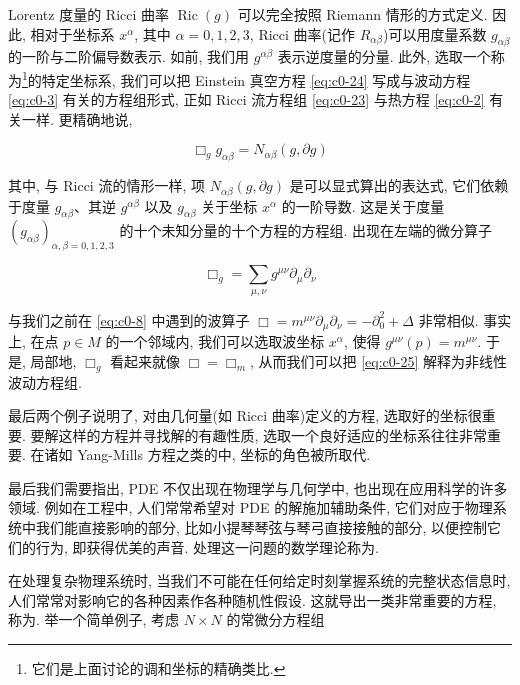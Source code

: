 Lorentz 度量的 Ricci 曲率 $\operatorname{Ric}(g)$ 可以完全按照 Riemann 情形的方式定义.
因此, 相对于坐标系 $x^{\alpha}$, 其中 $\alpha = 0, 1, 2, 3$, Ricci 曲率(记作 $R_{\alpha \beta}$)可以用度量系数 $g_{\alpha \beta}$ 的一阶与二阶偏导数表示.
如前, 我们用 $g^{\alpha \beta}$ 表示逆度量的分量.
此外, 选取一个称为\footnote{它们是上面讨论的调和坐标的精确类比.}的特定坐标系, 我们可以把 Einstein 真空方程 \eqref{eq:c0-24} 写成与波动方程 \eqref{eq:c0-3} 有关的方程组形式, 正如 Ricci 流方程组 \eqref{eq:c0-23} 与热方程 \eqref{eq:c0-2} 有关一样.
更精确地说,

\begin{equation}\label{eq:c0-25}
\Box_{g} g_{\alpha \beta} = N_{\alpha \beta}(g, \partial g)
\end{equation}

其中, 与 Ricci 流的情形一样, 项 $N_{\alpha \beta}(g, \partial g)$ 是可以显式算出的表达式, 它们依赖于度量 $g_{\alpha \beta}$、其逆 $g^{\alpha \beta}$ 以及 $g_{\alpha \beta}$ 关于坐标 $x^{\alpha}$ 的一阶导数.
这是关于度量 $(g_{\alpha \beta})_{\alpha, \beta = 0, 1, 2, 3}$ 的十个未知分量的十个方程的方程组.
出现在左端的微分算子

\[
\Box_{g} = \sum_{\mu, \nu} g^{\mu \nu} \partial_{\mu} \partial_{\nu}
\]

与我们之前在 \eqref{eq:c0-8} 中遇到的波算子 $\Box = m^{\mu \nu} \partial_{\mu} \partial_{\nu} = -\partial_{0}^{2} + \Delta$ 非常相似.
事实上, 在点 $p \in M$ 的一个邻域内, 我们可以选取波坐标 $x^{\alpha}$, 使得 $g^{\mu \nu}(p) = m^{\mu \nu}$.
于是, 局部地, $\Box_{g}$ 看起来就像 $\Box = \Box_{m}$, 从而我们可以把 \eqref{eq:c0-25} 解释为非线性波动方程组.

最后两个例子说明了, 对由几何量(如 Ricci 曲率)定义的方程, 选取好的坐标很重要.
要解这样的方程并寻找解的有趣性质, 选取一个良好适应的坐标系往往非常重要.
在诸如 Yang-Mills 方程之类的中, 坐标的角色被所取代.

最后我们需要指出, PDE 不仅出现在物理学与几何学中, 也出现在应用科学的许多领域.
例如在工程中, 人们常常希望对 PDE 的解施加辅助条件, 它们对应于物理系统中我们能直接影响的部分, 比如小提琴琴弦与琴弓直接接触的部分, 以便控制它们的行为, 即获得优美的声音.
处理这一问题的数学理论称为.

在处理复杂物理系统时, 当我们不可能在任何给定时刻掌握系统的完整状态信息时, 人们常常对影响它的各种因素作各种随机性假设.
这就导出一类非常重要的方程, 称为.
举一个简单例子, 考虑 $N \times N$ 的常微分方程组

